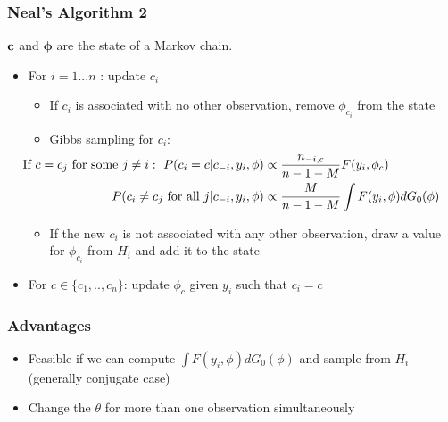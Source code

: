 \begin{frame} %
	\frametitle{Neal's Algorithm 2}
	$\textbf c$ and $\boldsymbol\phi$ are the state of a Markov chain.
	\begin{itemize}
	    \item For $i= 1...n$ : update $c_{i}$  \\
	    \begin{itemize}
	        \item If $c_{i}$ is associated with no other observation, remove $\phi_{c_{i}}$ from the state
		    \item Gibbs sampling for $c_{i}$:
	        \begin{align*}
		        \hspace{-35pt}
                \text{If} \ c=c_{j} \ \text{for some } j\neq i: \ P(c_{i}=c | c_{-i}, y_{i},\mathbf{\phi}) &\propto \frac{n_{-i,c}}{n-1-M} F(y_{i},\phi_{c}) \\
                P(c_{i}\neq c_{j} \text{ for all } j | c_{-i}, y_{i},\mathbf{\phi}) &\propto \frac{M }{n-1-M} \int F(y_{i},\phi)dG_{0}(\phi)
            \end{align*}
                
            \item  If the new $c_{i}$ is not associated with any other observation, draw a value for $\phi_{c_{i}}$ from $H_{i}$ and add it to the state
        \end{itemize} 
        
        \item For $c \in \{c_{1},..,c_{n}\}$: update $\phi_{c}$ given $y_{i}$ such that $c_{i}=c$
            
	\end{itemize}
		
\end{frame}


\begin{frame} %
	\frametitle{Advantages}
	\begin{itemize}
	    \item Feasible if we can compute $\int F(y_{i},\phi)dG_{0}(\phi)$ and sample from $H_{i}$ (generally conjugate case)
	    \item Change the $\theta$ for more than one observation simultaneously
	\end{itemize}
\end{frame}



